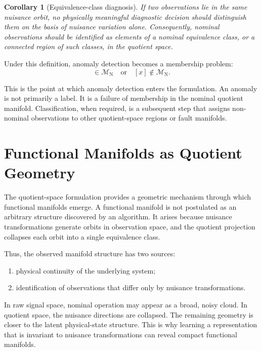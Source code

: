 \documentclass[11pt,letterpaper]{article}
\newtheorem{corollary}{Corollary}
\newcommand{\Mnominal}{\ensuremath{\mathcal{M}_{\mathrm{N}}}}
\begin{document}
\begin{corollary}[Equivalence-class diagnosis]
If two observations lie in the same nuisance orbit, no physically meaningful diagnostic decision should distinguish them on the basis of nuisance variation alone.
Consequently, nominal observations should be identified as elements of a nominal equivalence class, or a connected region of such classes, in the quotient space.
\end{corollary}

Under this definition, anomaly detection becomes a membership problem:
\begin{equation}
[x] \in \Mnominal
\quad \text{or} \quad
[x] \notin \Mnominal.
\label{eq:membership}
\end{equation}

This is the point at which anomaly detection enters the formulation.
An anomaly is not primarily a label.
It is a failure of membership in the nominal quotient manifold.
Classification, when required, is a subsequent step that assigns non-nominal observations to other quotient-space regions or fault manifolds.


\section{Functional Manifolds as Quotient Geometry}

The quotient-space formulation provides a geometric mechanism through which functional manifolds emerge.
A functional manifold is not postulated as an arbitrary structure discovered by an algorithm.
It arises because nuisance transformations generate orbits in observation space, and the quotient projection collapses each orbit into a single equivalence class.

Thus, the observed manifold structure has two sources:

\begin{enumerate}[label=(\roman*)]
    \item physical continuity of the underlying system;
    \item identification of observations that differ only by nuisance transformations.
\end{enumerate}

In raw signal space, nominal operation may appear as a broad, noisy cloud.
In quotient space, the nuisance directions are collapsed.
The remaining geometry is closer to the latent physical-state structure.
This is why learning a representation that is invariant to nuisance transformations can reveal compact functional manifolds.
\end{document}
